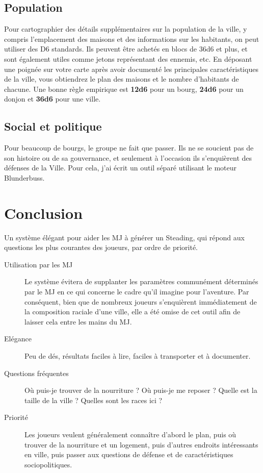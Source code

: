 \documentclass{article}
\begin{document}
\subsection*{Population}
Pour cartographier des détails supplémentaires sur la population de la ville, y compris l'emplacement des maisons et des informations sur les habitants, on peut utiliser des D6 standards. Ils peuvent être achetés en blocs de 36d6 et plus, et sont également utiles comme jetons représentant des ennemis, etc. En déposant une poignée sur votre carte après avoir documenté les principales caractéristiques de la ville, vous obtiendrez le plan des maisons et le nombre d'habitants de chacune. Une bonne règle empirique est \textbf{12d6} pour un bourg, \textbf{24d6} pour un donjon et \textbf{36d6} pour une ville.

\subsection*{Social et politique}
Pour beaucoup de bourgs, le groupe ne fait que passer. Ils ne se soucient pas de son histoire ou de sa gouvernance, et seulement à l'occasion ils s'enquièrent des défenses de la Ville. Pour cela, j'ai écrit un outil séparé utilisant le moteur Blunderbuss.

\section*{Conclusion}
Un système élégant pour aider les MJ à générer un Steading, qui répond aux questions les plus courantes des joueurs, par ordre de priorité.

\begin{description}
	\item [Utilisation par les MJ]Le système évitera de supplanter les paramètres communément déterminés par le MJ en ce qui concerne le cadre qu'il imagine pour l'aventure. Par conséquent, bien que de nombreux joueurs s'enquièrent immédiatement de la composition raciale d'une ville, elle a été omise de cet outil afin de laisser cela entre les mains du MJ.
	\item [Elégance] Peu de dés, résultats faciles à lire, faciles à transporter et à documenter.
	\item [Questions fréquentes] Où puis-je trouver de la nourriture ? Où puis-je me reposer ? Quelle est la taille de la ville ? Quelles sont les races ici ?
	\item [Priorité] Les joueurs veulent généralement connaître d'abord le plan, puis où trouver de la nourriture et un logement, puis d'autres endroits intéressants en ville, puis passer aux questions de défense et de caractéristiques sociopolitiques. 
\end{description}
\end{document}
